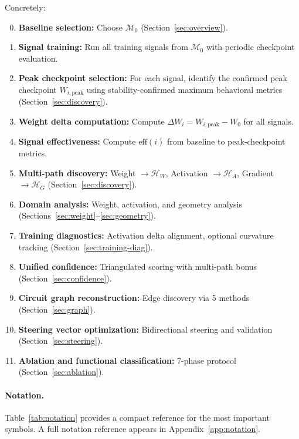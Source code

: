 \documentclass[11pt]{article}
\begin{document}
\noindent Concretely:
\begin{enumerate}[nosep]
\setcounter{enumi}{-1}
\item \textbf{Baseline selection:} Choose $\mathcal{M}_0$ (Section~\ref{sec:overview}).
\item \textbf{Signal training:} Run all training signals from $\mathcal{M}_0$ with periodic checkpoint evaluation.
\item \textbf{Peak checkpoint selection:} For each signal, identify the confirmed peak checkpoint $W_{i,\text{peak}}$ using stability-confirmed maximum behavioral metrics (Section~\ref{sec:discovery}).
\item \textbf{Weight delta computation:} Compute $\Delta W_i = W_{i,\text{peak}} - W_0$ for all signals.
\item \textbf{Signal effectiveness:} Compute $\text{eff}(i)$ from baseline to peak-checkpoint metrics.
\item \textbf{Multi-path discovery:} Weight $\to \mathcal{H}_W$, Activation $\to \mathcal{H}_A$, Gradient $\to \mathcal{H}_G$ (Section~\ref{sec:discovery}).
\item \textbf{Domain analysis:} Weight, activation, and geometry analysis (Sections~\ref{sec:weight}--\ref{sec:geometry}).
\item \textbf{Training diagnostics:} Activation delta alignment, optional curvature tracking (Section~\ref{sec:training-diag}).
\item \textbf{Unified confidence:} Triangulated scoring with multi-path bonus (Section~\ref{sec:confidence}).
\item \textbf{Circuit graph reconstruction:} Edge discovery via 5 methods (Section~\ref{sec:graph}).
\item \textbf{Steering vector optimization:} Bidirectional steering and validation (Section~\ref{sec:steering}).
\item \textbf{Ablation and functional classification:} 7-phase protocol (Section~\ref{sec:ablation}).
\end{enumerate}

\paragraph{Notation.} Table~\ref{tab:notation} provides a compact reference for the most important symbols. A full notation reference appears in Appendix~\ref{app:notation}.
\end{document}
